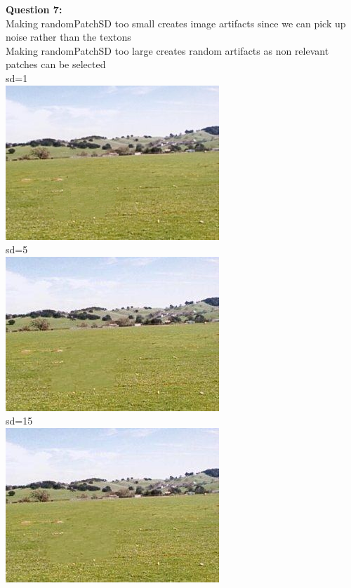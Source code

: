 \documentclass[]{article}
\begin{document}
\pagebreak
\textbf{Question 7:}\\
Making randomPatchSD too small creates image artifacts since we can pick up noise rather than the textons\\
Making randomPatchSD too large creates random artifacts as non relevant patches can be selected \\
sd=1\\
	\includegraphics[width=0.7\linewidth]{donkey_results_sd1.jpg}\\
sd=5\\
	\includegraphics[width=0.7\linewidth]{donkey_results_sd5.jpg}\\
sd=15\\
	\includegraphics[width=0.7\linewidth]{donkey_results_sd15.jpg}\\
\pagebreak
\end{document}
